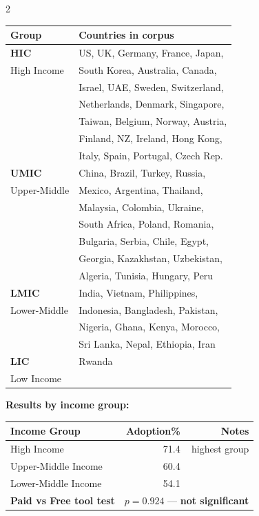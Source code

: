 \documentclass[10pt,a4paper]{article}
\begin{document}
\begin{multicols}{2}
\begin{tabular}{@{}ll@{}}
\toprule
Group & Countries in corpus \\
\midrule
\textbf{HIC} & US, UK, Germany, France, Japan, \\
High Income  & South Korea, Australia, Canada, \\
             & Israel, UAE, Sweden, Switzerland, \\
             & Netherlands, Denmark, Singapore, \\
             & Taiwan, Belgium, Norway, Austria, \\
             & Finland, NZ, Ireland, Hong Kong, \\
             & Italy, Spain, Portugal, Czech Rep. \\[4pt]
\textbf{UMIC} & China, Brazil, Turkey, Russia, \\
Upper-Middle  & Mexico, Argentina, Thailand, \\
              & Malaysia, Colombia, Ukraine, \\
              & South Africa, Poland, Romania, \\
              & Bulgaria, Serbia, Chile, Egypt, \\
              & Georgia, Kazakhstan, Uzbekistan, \\
              & Algeria, Tunisia, Hungary, Peru \\[4pt]
\textbf{LMIC} & India, Vietnam, Philippines, \\
Lower-Middle  & Indonesia, Bangladesh, Pakistan, \\
              & Nigeria, Ghana, Kenya, Morocco, \\
              & Sri Lanka, Nepal, Ethiopia, Iran \\[4pt]
\textbf{LIC}  & Rwanda \\
Low Income    & \\
\bottomrule
\end{tabular}

\end{multicols}

\vspace{6pt}
\textbf{Results by income group:}

\vspace{3pt}
\begin{tabular}{@{}lrr@{}}
\toprule
Income Group & Adoption\% & Notes \\
\midrule
High Income         & 71.4 & highest group \\
Upper-Middle Income & 60.4 & \\
Lower-Middle Income & 54.1 & \\
\midrule
\textbf{Paid vs Free tool test} & \multicolumn{2}{l}{$p = 0.924$ --- \textbf{not significant}} \\
\bottomrule
\end{tabular}
\end{document}
